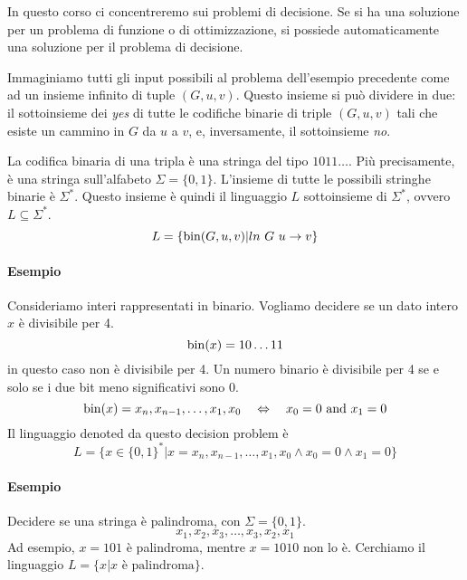 In questo corso ci concentreremo sui problemi di decisione. Se si ha una soluzione per un problema di funzione o di ottimizzazione, si possiede automaticamente una soluzione per il problema di decisione.\medskip

Immaginiamo tutti gli input possibili al problema dell'esempio precedente come ad un insieme infinito di tuple $(G,u,v)$. Questo insieme si può dividere in due: il sottoinsieme dei \emph{yes} di tutte le codifiche binarie di triple $(G,u,v)$ tali che esiste un cammino in $G$ da $u$ a $v$, e, inversamente, il sottoinsieme \emph{no}.
\begin{center}
\end{center}
La codifica binaria di una tripla è una stringa del tipo $1011\dots$. Più precisamente, è una stringa sull'alfabeto $\Sigma=\{0,1\}$. L'insieme di tutte le possibili stringhe binarie è $\Sigma^*$. Questo insieme è quindi il linguaggio $L$ sottoinsieme di $\Sigma^*$, ovvero $L\subseteq\Sigma^*$.
$$
    L = \{ \operatorname*{bin}(G,u,v)|ln~G~u\to v \}
$$

\paragraph{Esempio} Consideriamo interi rappresentati in binario. Vogliamo decidere se un dato intero $x$ è divisibile per 4.
$$
    \operatorname*{bin}(x) = 10\dots11
$$
in questo caso non è divisibile per 4. Un numero binario è divisibile per 4 se e solo se i due bit meno significativi sono 0.
$$
    \operatorname*{bin}(x) = x_n,x_{n-1},\dots,x_1,x_0 \quad \Leftrightarrow \quad x_0 = 0 \text{ and } x_1 = 0
$$
Il linguaggio denoted da questo decision problem è
$$
    L = \{ x\in\{0,1\}^* | x=x_n,x_{n-1},\dots,x_1,x_0 \land x_0 = 0 \land x_1 = 0 \}
$$


\paragraph{Esempio} Decidere se una stringa è palindroma, con $\Sigma = \{0,1\}$.
$$
    x_1,x_2,x_3,\dots,x_3,x_2,x_1
$$
Ad esempio, $x=101$ è palindroma, mentre $x=1010$ non lo è. Cerchiamo il linguaggio $L=\{x|x \text{ è palindroma}\}$.

